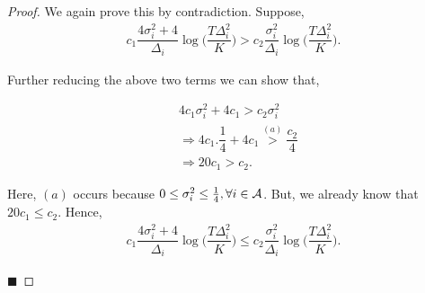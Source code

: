 \begin{proof}
We again prove this by contradiction. Suppose, 
\begin{align*}
c_1 \dfrac{4\sigma_i^2 + 4}{\Delta_i}\log\bigg( \dfrac{T\Delta_i^2}{K}\bigg) > c_2 \dfrac{\sigma_i^2}{\Delta_i}\log\bigg( \dfrac{T\Delta_i^2}{K}\bigg).
\end{align*}

Further reducing the above two terms we can show that, 

\begin{align*}
& 4c_1\sigma_i^2 + 4c_1 > c_2\sigma_i^2\\
& \Rightarrow 4c_1.\dfrac{1}{4} + 4c_1 \overset{(a)}{>} \dfrac{c_2}{4}\\
& \Rightarrow 20 c_1 > c_2.
\end{align*}

Here, $(a)$ occurs because $0\leq\sigma_i^2 \leq \frac{1}{4},\forall i\in \mathcal{A}$. But, we already know that $20 c_1 \leq c_2$. Hence, 
\begin{align*}
c_1 \dfrac{4\sigma_i^2 + 4}{\Delta_i}\log\bigg( \dfrac{T\Delta_i^2}{K}\bigg) \leq c_2 \dfrac{\sigma_i^2}{\Delta_i}\log\bigg( \dfrac{T\Delta_i^2}{K}\bigg).
\end{align*}

\hfill $\blacksquare$	
\end{proof}

